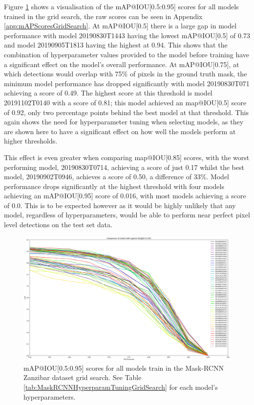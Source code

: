 Figure \ref{fig:mAP-graph} shows a visualisation of the mAP@IOU[0.5:0.95] scores for all models trained in the grid search, the raw scores can be seen in Appendix \ref{app:mAPScoresGridSearch}. At mAP@IOU[0.5] there is a large gap in model performance with model 20190830T1443 having the lowest mAP@IOU[0.5] of 0.73 and model 20190905T1813 having the highest at 0.94. This shows that the combination of hyperparameter values provided to the model before training have a significant effect on the model's overall performance. At mAP@IOU[0.75], at which detections would overlap with 75\% of pixels in the ground truth mask, the minimum model performance has dropped significantly with model 20190830T071 achieving a score of 0.49. The highest score at this threshold is model 20191102T0140 with a score of 0.81; this model achieved an map@IOU[0.5] score of 0.92, only two percentage points behind the best model at that threshold. This again shows the need for hyperparameter tuning when selecting models, as they are shown here to have a significant effect on how well the models perform at higher thresholds.

This effect is even greater when comparing map@IOU[0.85] scores, with the worst performing model, 20190830T0714,  achieving a score of just 0.17 whilst the best model, 20190902T0946, achieves a score of 0.50, a difference of 33\%. Model performance drops significantly at the highest threshold with four models achieving an mAP@IOU[0.95] score of 0.016, with most models achieving a score of 0.0. This is to be expected however as it would be highly unlikely that any model, regardless of hyperparameters, would be able to perform near perfect pixel level detections on the test set data. 

\begin{figure}[h]
	\begin{center}
		\includegraphics[scale=0.33]{Chapter3/figs/comparison_graph_all_diff_colours.png}
	\end{center}
	\caption{mAP@IOU[0.5:0.95] scores for all models train in the Mask-RCNN Zanzibar dataset grid search. See Table \ref{tab:MaskRCNNHyperparamTuningGridSearch} for each model's hyperparameters.}
	\label{fig:mAP-graph}
\end{figure}

